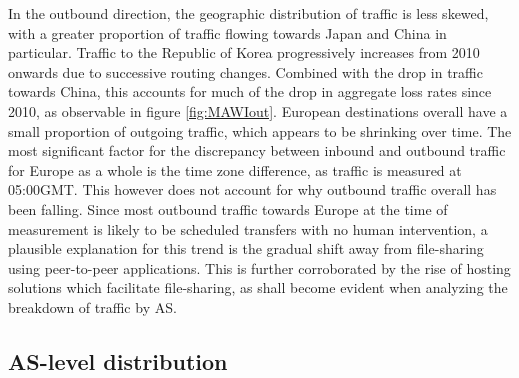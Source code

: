 In the outbound direction, the geographic distribution of traffic is less skewed, with a greater proportion of traffic flowing towards Japan and China in particular. 
Traffic to the Republic of Korea progressively increases from 2010 onwards due to successive routing changes.
Combined with the drop in traffic towards China, this accounts for much of the drop in aggregate loss rates since 2010, as observable in figure \ref{fig:MAWIout}.
European destinations overall have a small proportion of outgoing traffic, which appears to be shrinking over time. 
The most significant factor for the discrepancy between inbound and outbound traffic for Europe as a whole is the time zone difference, as traffic is measured at 05:00\acs{GMT}. 
This however does not account for why outbound traffic overall has been falling. 
Since most outbound traffic towards Europe at the time of measurement is likely to be scheduled transfers with no human intervention, a plausible explanation for this trend is the gradual shift away from file-sharing using peer-to-peer applications. 
This is further corroborated by the rise of hosting solutions which facilitate file-sharing, as shall become evident when analyzing the breakdown of traffic by \ac{AS}.

\subsection{\acs{AS}-level distribution}
\label{section:malawi:as}

